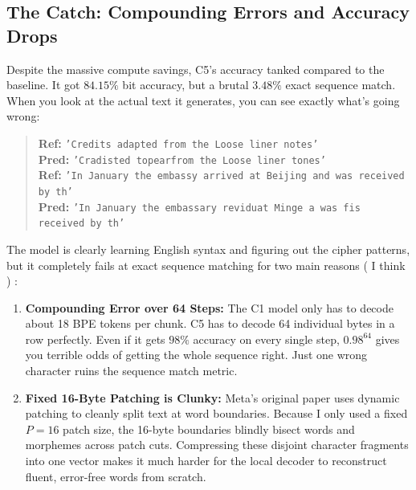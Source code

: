 \documentclass[12pt,a4paper]{article}
\begin{document}
\subsection{The Catch: Compounding Errors and Accuracy Drops}
Despite the massive compute savings, C5's accuracy tanked compared to the baseline. It got $84.15\%$ bit accuracy, but a brutal $3.48\%$ exact sequence match. When you look at the actual text it generates, you can see exactly what's going wrong:
\begin{quote}
\small
\textbf{Ref:} \texttt{'Credits adapted from the Loose liner notes'} \\
\textbf{Pred:} \texttt{'Cradisted topearfrom the Loose liner tones'} \\
\textbf{Ref:} \texttt{'In January the embassy arrived at Beijing and was received by th'} \\
\textbf{Pred:} \texttt{'In January the embassary reviduat Minge a was fis received by th'}
\end{quote}
The model is clearly learning English syntax and figuring out the cipher patterns, but it completely fails at exact sequence matching for two main reasons ( I think ) :
\begin{enumerate}
    \item \textbf{Compounding Error over 64 Steps:} The C1 model only has to decode about 18 BPE tokens per chunk. C5 has to decode 64 individual bytes in a row perfectly. Even if it gets $98\%$ accuracy on every single step, $0.98^{64}$ gives you terrible odds of getting the whole sequence right. Just one wrong character ruins the sequence match metric.
    \item \textbf{Fixed 16-Byte Patching is Clunky:} Meta's original paper uses dynamic patching to cleanly split text at word boundaries. Because I only used a fixed $P=16$ patch size, the 16-byte boundaries blindly bisect words and morphemes across patch cuts. Compressing these disjoint character fragments into one vector makes it much harder for the local decoder to reconstruct fluent, error-free words from scratch.
\end{enumerate}
\end{document}
